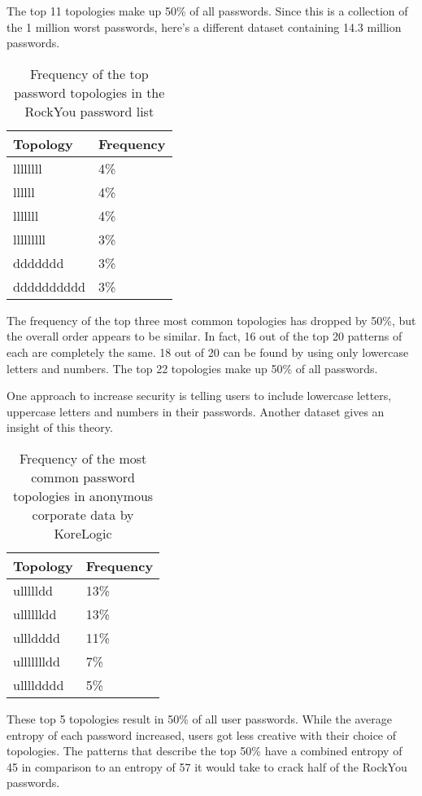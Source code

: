 The top 11 topologies make up 50\% of all passwords. Since this is a collection of the 1 million worst passwords, here's a different dataset containing 14.3 million passwords.

\begin{table}[h!]
\centering
\begin{tabular}{l l}
	Topology	& Frequency \\
	\hline
	llllllll	& 4\% \\
	llllll		& 4\% \\
	lllllll		& 4\% \\
	lllllllll	& 3\% \\
	ddddddd		& 3\% \\
	dddddddddd	& 3\%
\end{tabular}
\caption{Frequency of the top password topologies in the RockYou password list \cite{rockyou}}
\end{table}
\newpage

The frequency of the top three most common topologies has dropped by 50\%, but the overall order appears to be similar. In fact, 16 out of the top 20 patterns of each are completely the same. 18 out of 20 can be found by using only lowercase letters and numbers. The top 22 topologies make up 50\% of all passwords.

One approach to increase security is telling users to include lowercase letters, uppercase letters and numbers in their passwords. Another dataset gives an insight of this theory.

\begin{table}[h!]
\centering
\begin{tabular}{l l}
	Topology	& Frequency \\
	\hline
	ullllldd	& 13\% \\
	ulllllldd	& 13\% \\
	ullldddd	& 11\% \\
	ullllllldd	& 7\% \\
	ulllldddd	& 5\%
\end{tabular}
\caption{Frequency of the most common password topologies in anonymous corporate data by KoreLogic \cite{korelogic}}
\end{table}

These top 5 topologies result in 50\% of all user passwords. While the average entropy of each password increased, users got less creative with their choice of topologies. The patterns that describe the top 50\% have a combined entropy of 45 in comparison to an entropy of 57 it would take to crack half of the RockYou passwords.

